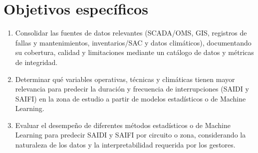 \section{Objetivos específicos}

\begin{enumerate}
    \item Consolidar las fuentes de datos relevantes (SCADA/OMS, GIS, registros de fallas y mantenimientos, inventarios/SAC y datos climáticos), documentando su cobertura, calidad y limitaciones mediante un catálogo de datos y métricas de integridad.
    
    \item Determinar qué variables operativas, técnicas y climáticas tienen mayor relevancia para predecir la duración y frecuencia de interrupciones (SAIDI y SAIFI) en la zona de estudio a partir de modelos estadísticos o de Machine Learning.
    
    \item Evaluar el desempeño de diferentes métodos estadísticos o de Machine Learning para predecir SAIDI y SAIFI por circuito o zona, considerando la naturaleza de los datos y la interpretabilidad requerida por los gestores.
\end{enumerate}
